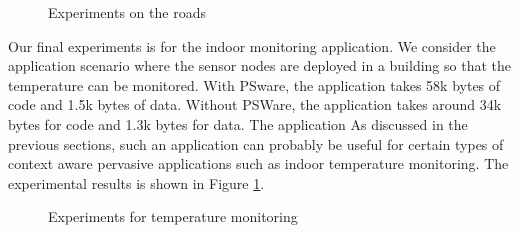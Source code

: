 \begin{figure}
\centering
{}
{}
\caption{Experiments on the roads}
\label{fig:itsResults}
\end{figure}

Our final experiments is for the indoor monitoring application. We consider the application scenario where the sensor nodes are deployed in a building so that the temperature can be monitored. With PSware, the application takes 58k bytes of code and 1.5k bytes of data. Without PSWare, the application takes around 34k bytes for code and 1.3k bytes for data. The application As discussed in the previous sections, such an application can probably be useful for certain types of context aware pervasive applications such as indoor temperature monitoring. The experimental results is shown in Figure \ref{fig:itsResults}. 

\begin{figure}
\centering
{}
{}
\caption{Experiments for temperature monitoring}
\label{fig:indoorResult}
\end{figure}
